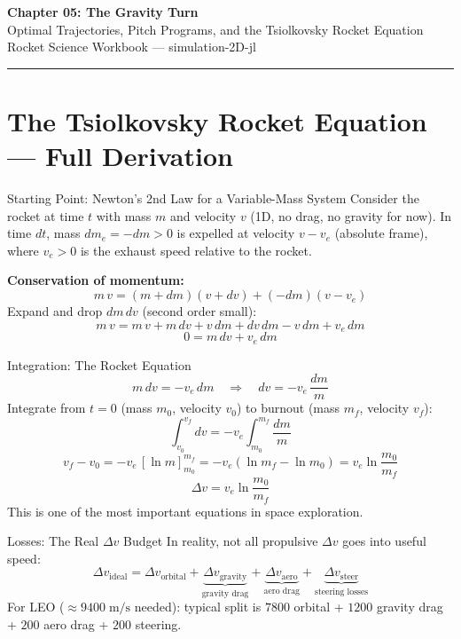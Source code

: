 \documentclass[12pt, a4paper]{article}
\begin{document}
\begin{center}
  {\LARGE \textbf{Chapter 05: The Gravity Turn}}\\[0.5em]
  {\large \textcolor{hintgray}{Optimal Trajectories, Pitch Programs, and the Tsiolkovsky Rocket Equation}}\\[0.3em]
  {\small \textcolor{hintgray}{Rocket Science Workbook — simulation-2D-jl}}
\end{center}
\vspace{1em}\hrule\vspace{1.5em}

\section{The Tsiolkovsky Rocket Equation — Full Derivation}

\begin{theorybox}{Starting Point: Newton's 2nd Law for a Variable-Mass System}
Consider the rocket at time $t$ with mass $m$ and velocity $v$ (1D, no drag, no gravity for now).
In time $dt$, mass $dm_e = -dm > 0$ is expelled at velocity $v - v_e$ (absolute frame), where $v_e > 0$ is the exhaust speed relative to the rocket.

\textbf{Conservation of momentum:}
\[
  m\,v = (m + dm)(v + dv) + (-dm)(v - v_e)
\]
Expand and drop $dm\,dv$ (second order small):
\[
  m\,v = m\,v + m\,dv + v\,dm + dv\,dm - v\,dm + v_e\,dm
\]
\[
  0 = m\,dv + v_e\,dm
\]
\end{theorybox}

\begin{theorybox}{Integration: The Rocket Equation}
\[
  m\,dv = -v_e\,dm \quad\Rightarrow\quad dv = -v_e\,\frac{dm}{m}
\]
Integrate from $t=0$ (mass $m_0$, velocity $v_0$) to burnout (mass $m_f$, velocity $v_f$):
\[
  \int_{v_0}^{v_f} dv = -v_e\int_{m_0}^{m_f}\frac{dm}{m}
\]
\[
  v_f - v_0 = -v_e\,[\ln m]_{m_0}^{m_f} = -v_e(\ln m_f - \ln m_0) = v_e\ln\frac{m_0}{m_f}
\]
\[
  \boxed{\Delta v = v_e\ln\frac{m_0}{m_f}}
\]
This is one of the most important equations in space exploration.
\end{theorybox}

\begin{theorybox}{Losses: The Real $\Delta v$ Budget}
In reality, not all propulsive $\Delta v$ goes into useful speed:
\[
  \Delta v_\text{ideal} = \Delta v_\text{orbital} + \underbrace{\Delta v_\text{gravity}}_{\text{gravity drag}} + \underbrace{\Delta v_\text{aero}}_{\text{aero drag}} + \underbrace{\Delta v_\text{steer}}_{\text{steering losses}}
\]
For LEO ($\approx 9400\;\text{m/s}$ needed): typical split is
$7800$ orbital + $1200$ gravity drag + $200$ aero drag + $200$ steering.
\end{theorybox}
\end{document}
